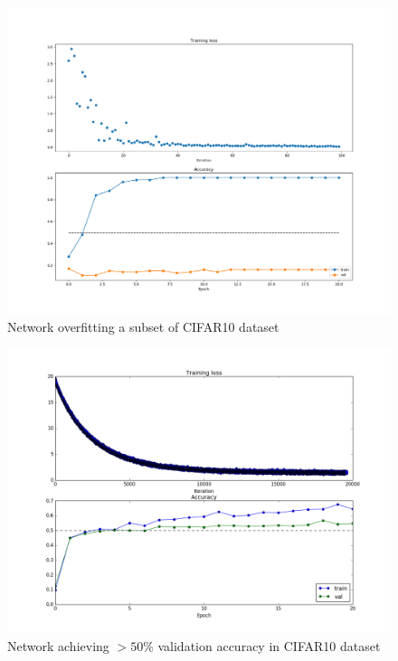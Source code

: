 \documentclass[12pt,twoside]{article}
\begin{document}
\begin{figure}[H]
\centering %
\includegraphics[width = 0.8\hsize]{./figures/overfit.png} %
\caption{Network overfitting a subset of CIFAR10 dataset} %
\label{fig:overfit} %
\end{figure}

\begin{figure}[H]
\centering %
\includegraphics[width = 0.8\hsize]{./figures/cifar_2layer.png} %
\caption{Network achieving $>50\%$ validation accuracy in CIFAR10 dataset} %
\label{fig:cifar_2layer} %
\end{figure}
\end{document}
